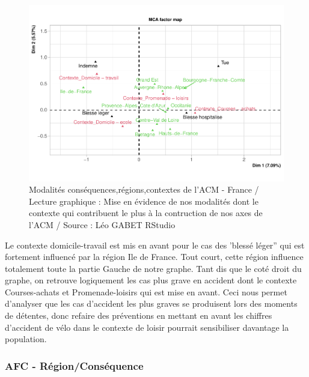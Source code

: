 \documentclass[french,]{compterendu}
\theoremstyle{urcastyle}
\theoremstyle{remark}
\begin{document}
\begin{figure}[H]

{\centering \includegraphics[width=0.9\linewidth]{Rapport_ADD_LEO-GABET_files/figure-latex/acm1modaCONTEXTE-1} 

}

\caption{Modalités conséquences,régions,contextes de l'ACM - France / Lecture graphique : Mise en évidence de nos modalités dont le contexte qui contribuent le plus à la contruction de nos axes de l'ACM / Source : Léo GABET RStudio}\label{fig:acm1modaCONTEXTE}
\end{figure}

Le contexte domicile-travail est mis en avant pour le cas des 'blessé léger'' qui est fortement influencé par la région Ile de France. Tout court, cette région influence totalement toute la partie Gauche de notre graphe.
Tant dis que le coté droit du graphe, on retrouve logiquement les cas plus grave en accident dont le contexte Courses-achats et Promenade-loisirs qui est mise en avant.
Ceci nous permet d'analyser que les cas d'accident les plus graves se produisent lors des moments de détentes, donc refaire des préventions en mettant en avant les chiffres d'accident de vélo dans le contexte de loisir pourrait sensibiliser davantage la population.

\hypertarget{afc---ruxe9gionconsuxe9quence}{%
\subsubsection{AFC - Région/Conséquence}\label{afc---ruxe9gionconsuxe9quence}}
\end{document}
